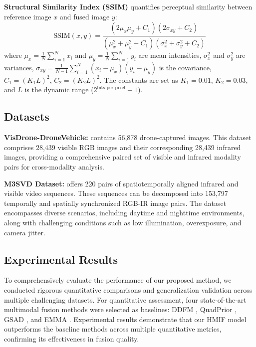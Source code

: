 \documentclass[journal]{IEEEtran}
\begin{document}
\textbf{Structural Similarity Index (SSIM)} quantifies perceptual similarity between reference image \(x\) and fused image \(y\):
\begin{equation}
    \text{SSIM}(x,y) = \frac{(2\mu_x\mu_y + C_1)(2\sigma_{xy} + C_2)}{(\mu_x^2 + \mu_y^2 + C_1)(\sigma_x^2 + \sigma_y^2 + C_2)}
\end{equation}
where \(\mu_x = \frac{1}{N}\sum_{i=1}^{N} x_i\) and \(\mu_y = \frac{1}{N}\sum_{i=1}^{N} y_i\) are mean intensities, \(\sigma_x^2\) and \(\sigma_y^2\) are variances, \(\sigma_{xy} = \frac{1}{N-1}\sum_{i=1}^{N}(x_i - \mu_x)(y_i - \mu_y)\) is the covariance, \(C_1 = (K_1 L)^2\), \(C_2 = (K_2 L)^2\). The constants are set as \(K_1 = 0.01\), \(K_2 = 0.03\), and \(L\) is the dynamic range (\(2^{\text{bits per pixel}} - 1\)).

\subsection{Datasets}

\textbf{VisDrone-DroneVehicle:} \citet{sun2021dronebasedrgbinfraredcrossmodalityvehicle} contains 56,878 drone-captured images. This dataset comprises 28,439 visible RGB images and their corresponding 28,439 infrared images, providing a comprehensive paired set of visible and infrared modality pairs for cross-modality analysis.

\textbf{M3SVD Dataset:} \citet{TANG2025VideoFusion} offers 220 pairs of spatiotemporally aligned infrared and visible video sequences. These sequences can be decomposed into 153,797 temporally and spatially synchronized RGB-IR image pairs. The dataset encompasses diverse scenarios, including daytime and nighttime environments, along with challenging conditions such as low illumination, overexposure, and camera jitter.

\subsection{Experimental Results}
To comprehensively evaluate the performance of our proposed method, we conducted rigorous quantitative comparisons and generalization validation across multiple challenging datasets. For quantitative assessment, four state-of-the-art multimodal fusion methods were selected as baselines: DDFM \cite{zhao2023ddfmdenoisingdiffusionmodel}, QuadPrior \cite{wang2024zeroreferencelowlightenhancementphysical}, GSAD \cite{NEURIPS2023_fc034d18}, and EMMA \cite{zhao2024equivariant}. Experimental results demonstrate that our HMIF model outperforms the baseline methods across multiple quantitative metrics, confirming its effectiveness in fusion quality.
\end{document}
